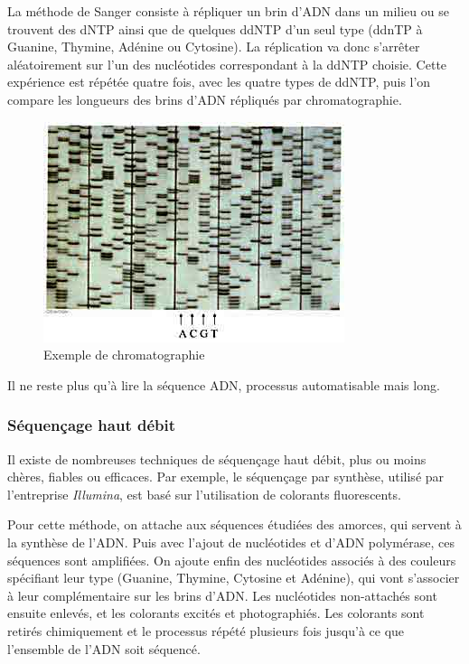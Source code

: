 La méthode de Sanger consiste à répliquer un brin d'ADN dans un milieu ou se trouvent des dNTP ainsi que de quelques ddNTP d'un seul type (ddnTP à Guanine, Thymine, Adénine ou Cytosine). La réplication va donc s’arrêter aléatoirement sur l'un des nucléotides correspondant à la ddNTP choisie. Cette expérience est répétée quatre fois, avec les quatre types de ddNTP, puis l'on compare les longueurs des brins d'ADN répliqués par chromatographie.


\begin{figure}[!ht]
    \center
    \includegraphics[]{./images/chromato_acanthoweb.jpg}
    \caption{Exemple de chromatographie}
    \label{chromato}
\end{figure}


Il ne reste plus qu'à lire la séquence ADN, processus automatisable mais long.

\subsubsection{Séquençage haut débit}
Il existe de nombreuses techniques de séquençage haut débit, plus ou moins chères, fiables ou efficaces.
Par exemple, le séquençage par synthèse, utilisé par l'entreprise \emph{Illumina}, est basé sur l'utilisation de colorants fluorescents.

Pour cette méthode, on attache aux séquences étudiées des amorces, qui servent à la synthèse de l'ADN. Puis avec l'ajout de nucléotides et d'ADN polymérase, ces séquences sont amplifiées. On ajoute enfin des nucléotides associés à des couleurs spécifiant leur type (Guanine, Thymine, Cytosine et Adénine), qui vont s'associer à leur complémentaire sur les brins d'ADN. Les nucléotides non-attachés sont ensuite enlevés, et les colorants excités et photographiés. Les colorants sont retirés chimiquement et le processus répété plusieurs fois jusqu'à ce que l'ensemble de l'ADN soit séquencé.

